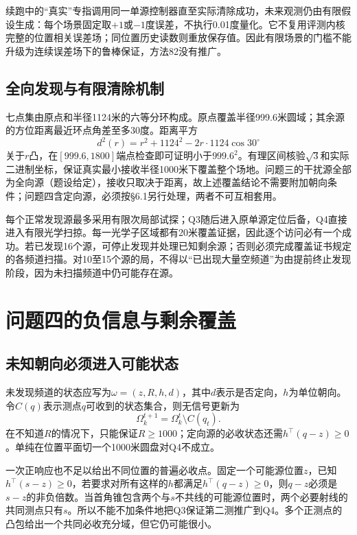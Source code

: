 \documentclass[UTF8,a4paper,zihao=-4,fontset=fandol]{ctexart}
\begin{document}
续跑中的“真实”专指调用同一单源控制器直至实际清除成功，未来观测仍由有限假设生成：每个场景固定取$+1$或$-1$度误差，不执行0.01度量化。它不复用评测内核完整的位置相关误差场；同位置历史读数则重放保存值。因此有限场景的门槛不能升级为连续误差场下的鲁棒保证，方法82没有推广。

\subsection{全向发现与有限清除机制}
七点集由原点和半径1124米的六等分环构成。原点覆盖半径999.6米圆域；其余源的方位距离最近环点角差至多30度。距离平方
\begin{equation}d^2(r)=r^2+1124^2-2r\cdot1124\cos30^\circ\end{equation}
关于$r$凸，在$[999.6,1800]$端点检查即可证明小于$999.6^2$。有理区间核验$\sqrt3$和实际二进制坐标，保证真实最小接收半径1000米下覆盖整个场地。问题三的干扰源全部为全向源（题设给定），接收只取决于距离，故上述覆盖结论不需要附加朝向条件；问题四含定向源，必须按\S6.1另行处理，两者不可互相套用。

每个正常发现源最多采用有限次局部试探；Q3随后进入原单源定位后备，Q4直接进入有限光学扫掠。每一光学子区域都有20米覆盖证据，因此逐个访问必有一个成功。若已发现16个源，可停止发现并处理已知剩余源；否则必须完成覆盖证书规定的各频道扫描。对10至15个源的局，不得以“已出现大量空频道”为由提前终止发现阶段，因为未扫描频道中仍可能存在源。

\section{问题四的负信息与剩余覆盖}
\subsection{未知朝向必须进入可能状态}
未发现频道的状态应写为$\omega=(z,R,h,d)$，其中$d$表示是否定向，$h$为单位朝向。令$C(q)$表示测点$q$可收到的状态集合，则无信号更新为
\begin{equation}\Omega_k^{t+1}=\Omega_k^t\setminus C(q_t).\end{equation}
在不知道$R$的情况下，只能保证$R\ge1000$；定向源的必收状态还需$h^\top(q-z)\ge0$。单纯在位置平面切一个1000米圆盘对Q4不成立。

一次正响应也不足以给出不同位置的普遍必收点。固定一个可能源位置$z$，已知$h^\top(s-z)\ge0$，若要求对所有这样的$h$都满足$h^\top(q-z)\ge0$，则$q-z$必须是$s-z$的非负倍数。当首角锥包含两个与$s$不共线的可能源位置时，两个必要射线的共同测点只有$s$。所以不能不加条件地把Q3保证第二测推广到Q4。多个正测点的凸包给出一个共同必收充分域，但它仍可能很小。
\end{document}
